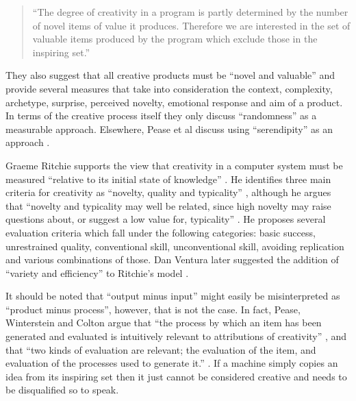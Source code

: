 \begin{quotation}
  ``The degree of creativity in a program is partly determined by the number of novel items of value it produces. Therefore we are interested in the set of valuable items produced by the program which exclude those in the inspiring set.'' 
\end{quotation}

They also suggest that all creative products must be ``novel and valuable'' \citeyear[p.1]{Pease2001} and provide several measures that take into consideration the context, complexity, archetype, surprise, perceived novelty, emotional response and aim of a product. In terms of the creative process itself they only discuss ``randomness'' as a measurable approach. Elsewhere, Pease et al discuss using ``serendipity'' as an approach \citeyear{Pease2013}.

Graeme Ritchie supports the view that creativity in a computer system must be measured ``relative to its initial state of knowledge'' \autocite[p.72]{Ritchie2007}. He identifies three main criteria for creativity as ``novelty, quality and typicality'' \citeyear[p.72-73]{Ritchie2007}, although he argues that ``novelty and typicality may well be related, since high novelty may raise questions about, or suggest a low value for, typicality'' \citeyear[p.73]{Ritchie2007} \citeyear[see also][]{Ritchie2001}. He proposes several evaluation criteria which fall under the following categories: \autocite[p.91-92]{Ritchie2007} basic success, unrestrained quality, conventional skill, unconventional skill, avoiding replication and various combinations of those. Dan Ventura later suggested the addition of ``variety and efficiency'' to Ritchie's model \citeyear[p.7]{Ventura2008}.

It should be noted that ``output minus input'' might easily be misinterpreted as ``product minus process'', however, that is not the case. In fact, Pease, Winterstein and Colton argue that ``the process by which an item has been generated and evaluated is intuitively relevant to attributions of creativity'' \citeyear[p.6]{Pease2001}, and that ``two kinds of evaluation are relevant; the evaluation of the item, and evaluation of the processes used to generate it.'' \citeyear[p.7]{Pease2001}. If a machine simply copies an idea from its inspiring set then it just cannot be considered creative and needs to be disqualified so to speak.

